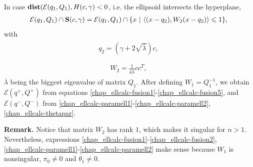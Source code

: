 \documentclass[letterpaper,10pt,english]{sphinxmanual}
\begin{document}
In case ${\bf dist}({\mathcal E}(q_1,Q_1),H(c,\gamma)<0$, i.e. the
ellipsoid intersects the hyperplane,
\begin{gather}
\begin{split}{\mathcal E}(q_1,Q_1)\cap{\bf S}(c,\gamma) =
{\mathcal E}(q_1,Q_1)\cap\{x ~|~ \langle (x-q_2),W_2(x-q_2)\rangle\leqslant1\},\end{split}\notag
\end{gather}
with
\label{chap_ellcalc:equation-hsell1}\begin{gather}
\begin{split}q_2  =  (\gamma + 2\sqrt{\overline{\lambda}})c,\\\end{split}\label{chap_ellcalc-hsell1}
\end{gather}\label{chap_ellcalc:equation-hsell2}\begin{gather}
\begin{split}W_2  =  \frac{1}{4\overline{\lambda}}cc^T,\end{split}\label{chap_ellcalc-hsell2}
\end{gather}
$\overline{\lambda}$ being the biggest eigenvalue of matrix
$Q_1$. After defining $W_1=Q_1^{-1}$, we obtain
${\mathcal E}(q^+,Q^+)$ from equations \eqref{chap_ellcalc-fusion1}-\eqref{chap_ellcalc-fusion5}, and
${\mathcal E}(q^-,Q^-)$ from \eqref{chap_ellcalc-paramell1}-\eqref{chap_ellcalc-paramell2},
\eqref{chap_ellcalc-thetapar}.

\textbf{Remark.} Notice that matrix $W_2$ has rank $1$, which
makes it singular for $n>1$. Nevertheless, expressions
\eqref{chap_ellcalc-fusion1}-\eqref{chap_ellcalc-fusion2}, \eqref{chap_ellcalc-paramell1}-\eqref{chap_ellcalc-paramell2} make sense because
$W_1$ is nonsingular, $\pi_0\neq0$ and
$\hat{\theta}_1\neq0$.
\end{document}

